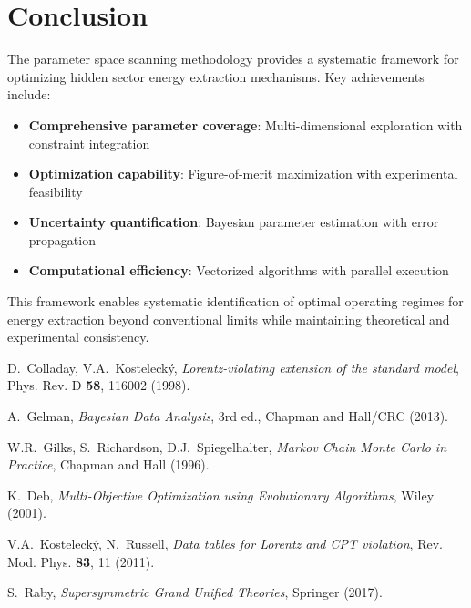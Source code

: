 \documentclass[11pt]{article}
\begin{document}
\section{Conclusion}

The parameter space scanning methodology provides a systematic framework for optimizing hidden sector energy extraction mechanisms. Key achievements include:

\begin{itemize}
    \item \textbf{Comprehensive parameter coverage}: Multi-dimensional exploration with constraint integration
    \item \textbf{Optimization capability}: Figure-of-merit maximization with experimental feasibility
    \item \textbf{Uncertainty quantification}: Bayesian parameter estimation with error propagation
    \item \textbf{Computational efficiency}: Vectorized algorithms with parallel execution
\end{itemize}

This framework enables systematic identification of optimal operating regimes for energy extraction beyond conventional limits while maintaining theoretical and experimental consistency.

\begin{thebibliography}{9}

 D.~Colladay, V.A.~Kostelecký, \textit{Lorentz-violating extension of the standard model}, Phys. Rev. D \textbf{58}, 116002 (1998).

 A.~Gelman, \textit{Bayesian Data Analysis}, 3rd ed., Chapman and Hall/CRC (2013).

 W.R.~Gilks, S.~Richardson, D.J.~Spiegelhalter, \textit{Markov Chain Monte Carlo in Practice}, Chapman and Hall (1996).

 K.~Deb, \textit{Multi-Objective Optimization using Evolutionary Algorithms}, Wiley (2001).

 V.A.~Kostelecký, N.~Russell, \textit{Data tables for Lorentz and CPT violation}, Rev. Mod. Phys. \textbf{83}, 11 (2011).

 S.~Raby, \textit{Supersymmetric Grand Unified Theories}, Springer (2017).

\end{thebibliography}
\end{document}
